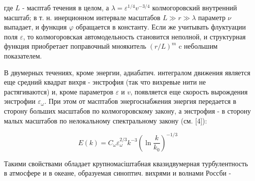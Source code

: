 \documentclass[10pt]{article}
\begin{document}
где $L$ - масптаб течения в целом, а $\lambda=\varepsilon^{1 / 4} v^{-3 / 4}$ колмогоровский внутренний масштаб; в т. н. инерционном интервале масштабов $L \gg r \gg \lambda$ параметр $\nu$ выпадает, и функция $\varphi$ обращается в константу. Если же учитывать флуктуации поля $\varepsilon$, то колмогоровская автомодельность становится неполной, и структурная функция приобретает поправочный мноякитель $(r / L)^{m}$ c небольшим показателем.



В двумерных течениях, кроме энергии, адиабатич. интегралом движения является еще средний квадрат вихря - энстрофия (так что вихревые нити не растягиваются) и, кроме параметров $\varepsilon$ и $v$, появляется еще скорость вырождения энстрофии $\varepsilon_{\omega}$. При этом от масптабов энергоснабжения энергия передается в сторону больших масштабов по колмогоровскому закону, а энстрофия - в сторону малых масштабов по нелокальному спектральному закону (см. [4]):



\[

E(k)=C_{\omega} \varepsilon_{\omega}^{2 / 3} k^{-3}\left(\ln \frac{k}{k_{0}}\right)^{-1 / 3}

\]



Такими свойствами обладает крупномасіштабная квазидвумерная турбулентность в атмосфере и в океане, образуемая синоптич. вихрями и волнами Россби -
\end{document}
